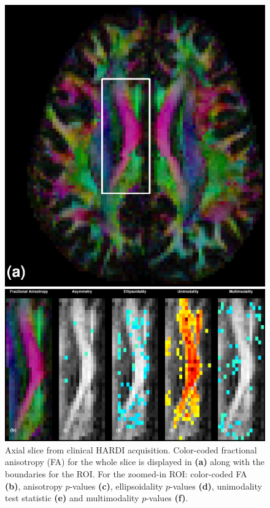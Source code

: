 \documentclass[dvips,aoas,preprint]{imsart}
\numberwithin{equation}{section}
\theoremstyle{plain}
\begin{document}
\begin{figure}[!htbp]
    \begin{minipage}[]{0.45\textwidth}
      \centering
      \includegraphics*[width=\textwidth]{slice1_slice+rect.eps}
    \end{minipage}
    \begin{minipage}[]{\textwidth}
      \centering      
      \includegraphics*[width=.85\textwidth]{slice1_statistics.eps}
    \end{minipage}
  \caption{Axial slice from clinical HARDI acquisition.  Color-coded
    fractional anisotropy (FA) for the whole slice is displayed in
    {\bf (a)} along with the boundaries for the ROI.  For the
    zoomed-in ROI: color-coded FA {\bf (b)}, anisotropy $p$-values
    {\bf (c)}, ellipsoidality $p$-values {\bf (d)}, unimodality test
    statistic {\bf (e)} and multimodality $p$-values {\bf (f)}.
  \label{figure-slice1}}
\end{figure}
\end{document}
